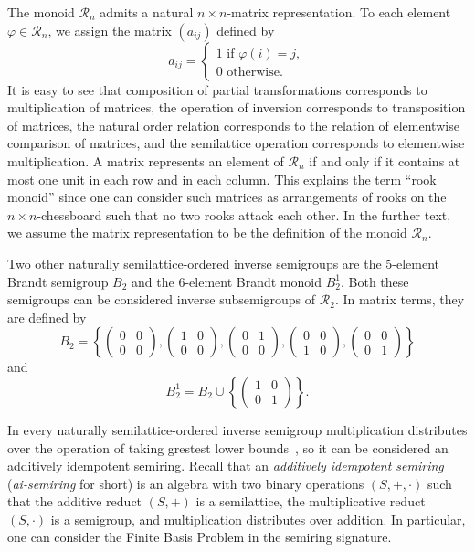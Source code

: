 \documentclass[12pt,draft]{amsart}
\begin{document}
The monoid $\mathcal R_n$ admits a natural $n\times n$-matrix representation. To each element $\varphi\in\mathcal R_n$, we assign the matrix $(a_{ij})$ defined by
$$a_{ij}=\begin{cases}
1\text{ if }\varphi(i)=j,\\
0\text{ otherwise.}
\end{cases}$$
It is easy to see that composition of partial transformations corresponds to multiplication of matrices, the operation of inversion corresponds to transposition of matrices, the natural order relation corresponds to the relation of elementwise comparison of matrices, and the semilattice operation corresponds to elementwise multiplication. A matrix represents an element of $\mathcal R_n$ if and only if it contains at most one unit in each row and in each column. This explains the term ``rook monoid'' since one can consider such matrices as arrangements of rooks on the $n\times n$-chessboard such that no two rooks attack each other. In the further text, we assume the matrix representation to be the definition of the monoid $\mathcal R_n$.


Two other naturally semilattice-ordered inverse semigroups are the 5-element Brandt semigroup $B_2$ and the 6-element Brandt monoid $B_2^1$. Both these semigroups can be considered inverse subsemigroups of $\mathcal R_2$. In matrix terms, they are defined by
$$B_2=\left\{\begin{pmatrix}
0&0\\
0&0
\end{pmatrix},
\begin{pmatrix}
1&0\\
0&0
\end{pmatrix},
\begin{pmatrix}
0&1\\
0&0
\end{pmatrix},
\begin{pmatrix}
0&0\\
1&0
\end{pmatrix},
\begin{pmatrix}
0&0\\
0&1
\end{pmatrix}\right\}$$
and
$$B_2^1=B_2\cup\left\{\begin{pmatrix}
1&0\\
0&1
\end{pmatrix}\right\}.$$

In every naturally semilattice-ordered inverse semigroup multiplication distributes over the operation of taking grestest lower bounds~\cite[Proposition~1.22]{Schein-73}, so it can be considered an additively idempotent semiring. Recall that an \emph{additively idempotent semiring} (\emph{ai-semiring} for short) is an algebra with two binary operations $(S,+,\cdot)$ such that the additive reduct $(S,+)$ is a semilattice, the multiplicative reduct $(S,\cdot)$ is a semigroup, and multiplication distributes over addition. In particular, one can consider the Finite Basis Problem in the semiring signature.
\end{document}

